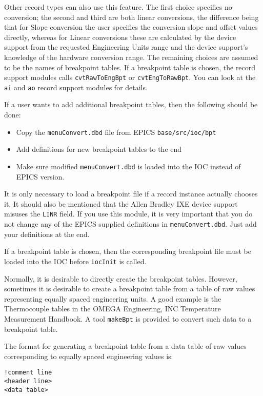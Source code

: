 Other record types can also use this feature.
The first choice specifies no conversion; the second and third are both linear conversions, the difference being that for Slope conversion the user specifies the conversion slope and offset values directly, whereas for Linear conversions these are calculated by the device support from the requested Engineering Units range and the device support's knowledge of the hardware conversion range.
The remaining choices are assumed to be the names of breakpoint tables.
If a breakpoint table is chosen, the record support modules calls \verb|cvtRawToEngBpt| or \verb|cvtEngToRawBpt|.
You can look at the \verb|ai| and \verb|ao| record support modules for details.

If a user wants to add additional breakpoint tables, then the following should be done:

\begin{itemize}
\item Copy the \verb|menuConvert.dbd| file from EPICS \verb|base/src/ioc/bpt|
\item Add definitions for new breakpoint tables to the end
\item Make sure modified \verb|menuConvert.dbd| is loaded  into the IOC instead of EPICS version.
\end{itemize}

It is only necessary to load a breakpoint file if a record instance actually chooses it.
It should also be mentioned that the Allen Bradley IXE device support misuses the \verb|LINR| field.
If you use this module, it is very important that you do not change any of the EPICS supplied definitions in \verb|menuConvert.dbd|.
Just add your definitions at the end.

If a breakpoint table is chosen, then the corresponding breakpoint file must be loaded into the IOC before \verb|iocInit| is called.

Normally, it is desirable to directly create the breakpoint tables.
However, sometimes it is desirable to create a breakpoint table from a table of raw values representing equally spaced engineering units.
A good example is the Thermocouple tables in the OMEGA Engineering, INC Temperature Measurement Handbook.
A tool \verb|makeBpt| is provided to convert such data to a breakpoint table.

The format for generating a breakpoint table from a data table of raw values corresponding to equally spaced engineering values is:

\begin{verbatim}
!comment line
<header line>
<data table>
\end{verbatim}

